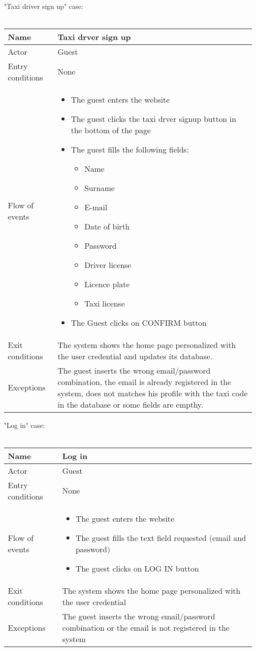 \newpage
\askpippo\\
"Taxi driver sign up" case:
\\
\\
\begin {tabular} {|p{3cm}|p{10cm}|}
\hline
Name & Taxi drver sign up\\
\hline
Actor & Guest\\
\hline
Entry conditions & None\\
\hline
Flow of events &
	\begin {itemize}
		\item The guest enters the website
		\item The guest clicks the taxi drver signup button in the bottom of the page
		\item The guest fills the following fields:
		\begin {itemize}
			\item Name
			\item Surname
			\item E-mail
			\item Date of birth
			\item Password
			\item Driver license
			\item Licence plate
			\item Taxi license
		\end {itemize}
		\item The Guest clicks on CONFIRM button
	\end {itemize}\\
\hline
Exit conditions & The system shows the home page personalized with the user credential and updates its database.\\
\hline
Exceptions & The guest inserts the wrong email/password combination, the email is already registered in the system, does not matches his profile with the taxi
code in the database or some fields are empthy.\\
\hline
\end {tabular}


\newpage
"Log in" case:
\\
\\
\begin{tabular}{|p{3cm}|p{10cm}|}
\hline
Name & Log in\\
\hline
Actor & Guest\\
\hline
Entry conditions & None\\
\hline
Flow of events & \begin{itemize}
					\item The guest enters the website
					\item The guest fills the text field requested $($email and password$)$
					\item The guest clicks on LOG IN button
				\end{itemize}\\
\hline
Exit conditions & The system shows the home page personalized with the user credential\\
\hline
Exceptions & The guest inserts the wrong email/password combination or the email is not registered in the system\\
\hline
\end {tabular}


